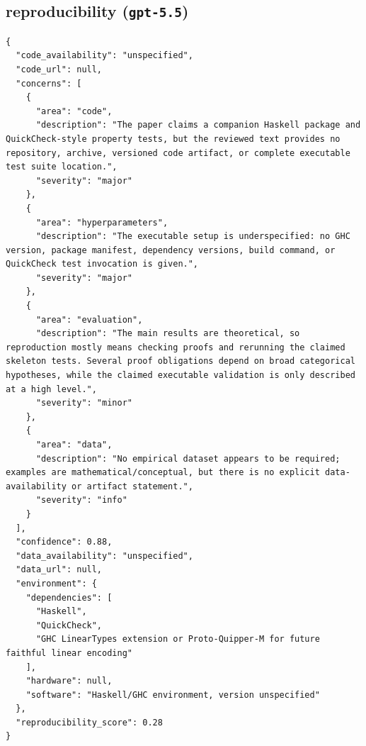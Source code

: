 \documentclass[11pt]{article}
\begin{document}
\subsection*{reproducibility (\texttt{gpt-5.5})}
\begin{verbatim}
{
  "code_availability": "unspecified",
  "code_url": null,
  "concerns": [
    {
      "area": "code",
      "description": "The paper claims a companion Haskell package and QuickCheck-style property tests, but the reviewed text provides no repository, archive, versioned code artifact, or complete executable test suite location.",
      "severity": "major"
    },
    {
      "area": "hyperparameters",
      "description": "The executable setup is underspecified: no GHC version, package manifest, dependency versions, build command, or QuickCheck test invocation is given.",
      "severity": "major"
    },
    {
      "area": "evaluation",
      "description": "The main results are theoretical, so reproduction mostly means checking proofs and rerunning the claimed skeleton tests. Several proof obligations depend on broad categorical hypotheses, while the claimed executable validation is only described at a high level.",
      "severity": "minor"
    },
    {
      "area": "data",
      "description": "No empirical dataset appears to be required; examples are mathematical/conceptual, but there is no explicit data-availability or artifact statement.",
      "severity": "info"
    }
  ],
  "confidence": 0.88,
  "data_availability": "unspecified",
  "data_url": null,
  "environment": {
    "dependencies": [
      "Haskell",
      "QuickCheck",
      "GHC LinearTypes extension or Proto-Quipper-M for future faithful linear encoding"
    ],
    "hardware": null,
    "software": "Haskell/GHC environment, version unspecified"
  },
  "reproducibility_score": 0.28
}
\end{verbatim}
\end{document}
